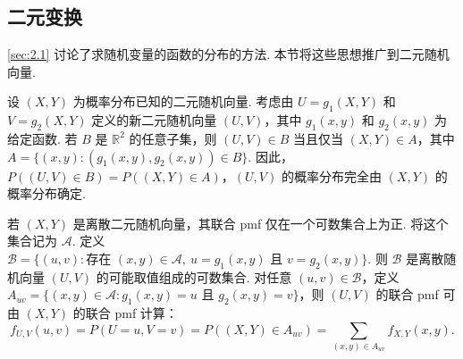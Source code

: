 \subsection{二元变换}\label{sec:4.3}
\autoref{sec:2.1} 讨论了求随机变量的函数的分布的方法. 本节将这些思想推广到二元随机向量.

设 $(X,Y)$ 为概率分布已知的二元随机向量. 考虑由 $U=g_1(X,Y)$ 和 $V=g_2(X,Y)$ 定义的新二元随机向量 $(U,V)$，其中 $g_1(x,y)$ 和 $g_2(x,y)$ 为给定函数. 若 $B$ 是 $\mathbb R^2$ 的任意子集，则 $(U,V)\in B$ 当且仅当 $(X,Y)\in A$，其中 $A=\{(x,y):(g_1(x,y),g_2(x,y))\in B\}$. 因此，$P((U,V)\in B)=P((X,Y)\in A)$，$(U,V)$ 的概率分布完全由 $(X,Y)$ 的概率分布确定.

若 $(X,Y)$ 是离散二元随机向量，其联合 pmf 仅在一个可数集合上为正. 将这个集合记为 $\mathscr A$. 定义 $\mathscr B=\{(u,v):\text{存在 }(x,y)\in\mathscr A,\ u=g_1(x,y)\text{ 且 }v=g_2(x,y)\}$. 则 $\mathscr B$ 是离散随机向量 $(U,V)$ 的可能取值组成的可数集合. 对任意 $(u,v)\in\mathscr B$，定义 $A_{uv}=\{(x,y)\in\mathscr A:g_1(x,y)=u\text{ 且 }g_2(x,y)=v\}$，则 $(U,V)$ 的联合 pmf 可由 $(X,Y)$ 的联合 pmf 计算：
\begin{equation}\label{eq:4.3.1}
f_{U,V}(u,v)=P(U=u,V=v)=P((X,Y)\in A_{uv})=\sum_{(x,y)\in A_{uv}}f_{X,Y}(x,y).
\end{equation}

